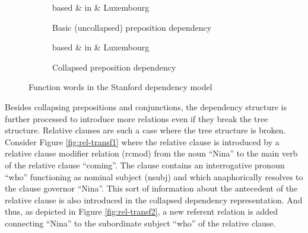     \begin{figure}[!ht]
    	\centering
    	\begin{subfigure}{.45\textwidth}
            \centering
            \begin{dependency}
                \begin{deptext}[]
                    based \& in \& Luxembourg\\
                \end{deptext}
            \end{dependency}
            \caption{Basic (uncollapsed) preposition dependency}
            \label{fig:prep-transf1}
        \end{subfigure}
    	\quad
    	\begin{subfigure}{.45\textwidth}
            \centering
            \begin{dependency}
                \begin{deptext}[]
                    based \& in \& Luxembourg\\
                \end{deptext}
            \end{dependency}
            \caption{Collapsed preposition dependency}
            \label{fig:prep-transf2}
        \end{subfigure}
        \caption{Function words in the Stanford dependency model}
        \label{fig:prep-transf}
    \end{figure}

    Besides collapsing prepositions and conjunctions, the dependency structure is further processed to introduce more relations even if they break the tree structure. Relative clauses are such a case where the tree structure is broken. Consider Figure \ref{fig:rel-transf1} where the relative clause is introduced by a relative clause modifier relation (rcmod) from the noun ``Nina'' to the main verb of the relative clause ``coming''. The clause contains an interrogative pronoun ``who''  functioning as nominal subject (nsubj) and which anaphorically resolves to the clause governor ``Nina''. This sort of information about the antecedent of the relative clause is also introduced in the collapsed dependency representation. And thus, as depicted in Figure \ref{fig:rel-transf2}, a new referent relation is added connecting ``Nina'' to the subordinate subject ``who'' of the relative clause.

